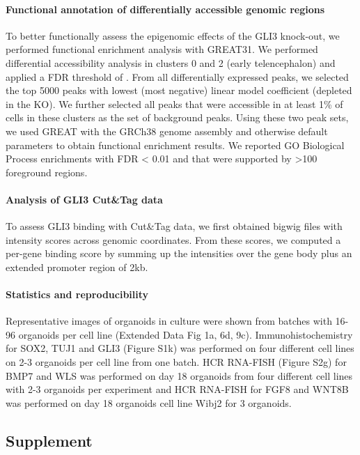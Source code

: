 \paragraph{Functional annotation of differentially accessible genomic regions}
To better functionally assess the epigenomic effects of the GLI3 knock-out, we performed functional enrichment analysis with GREAT31. We performed differential accessibility analysis in clusters 0 and 2 (early telencephalon) and applied a FDR threshold of . From all differentially expressed peaks, we selected the top 5000 peaks with lowest (most negative) linear model coefficient (depleted in the KO). We further selected all peaks that were accessible in at least 1\% of cells in these clusters as the set of background peaks. Using these two peak sets, we used GREAT with the GRCh38 genome assembly and otherwise default parameters to obtain functional enrichment results. We reported GO Biological Process enrichments with FDR < 0.01 and that were supported by >100 foreground regions.
 
\paragraph{Analysis of GLI3 Cut\&Tag data}
To assess GLI3 binding with Cut\&Tag data, we first obtained bigwig files with intensity scores across genomic coordinates. From these scores, we computed a per-gene binding score by summing up the intensities over the gene body plus an extended promoter region of 2kb.
 
\paragraph{Statistics and reproducibility}
Representative images of organoids in culture were shown from batches with 16-96 organoids per cell line (Extended Data Fig 1a, 6d, 9c). Immunohistochemistry for SOX2, TUJ1 and GLI3 (Figure S1k) was performed on four different cell lines on 2-3 organoids per cell line from one batch. HCR RNA-FISH (Figure S2g) for BMP7 and WLS was performed on day 18 organoids from four different cell lines with 2-3 organoids per experiment and HCR RNA-FISH for FGF8 and WNT8B was performed on day 18 organoids cell line Wibj2 for 3 organoids.



\subsection{Supplement}
\beginsupplement

